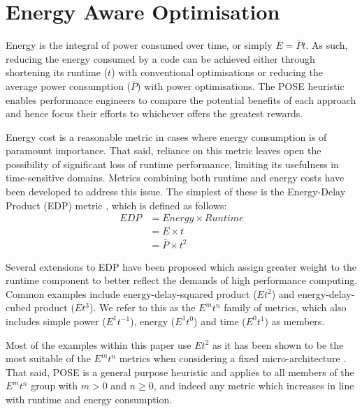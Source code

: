 \section{Energy Aware Optimisation}
\label{sec:optimisation}

Energy is the integral of power consumed over time, or simply $E = \bar{P}t$.
As such, reducing the energy consumed by a code can be achieved either through shortening its runtime ($t$) with conventional optimisations or reducing the average power consumption ($\bar{P}$) with power optimisations.
The POSE heuristic enables performance engineers to compare the potential benefits of each approach and hence focus their efforts to whichever offers the greatest rewards.

Energy cost is a reasonable metric in cases where energy consumption is of paramount importance.
That said, reliance on this metric leaves open the possibility of significant loss of runtime performance, limiting its usefulness in time-sensitive domains.
Metrics combining both runtime and energy costs have been developed to address this issue. 
The simplest of these is the Energy-Delay Product (EDP) metric \cite{gonzales:1995aa}, which is defined as follows:
\begin{align}
  EDP &= Energy \times Runtime \nonumber \\
      &= E \times t \nonumber \\
      &= \bar{P} \times t^2
  \label{eq:edp}
\end{align}

Several extensions to EDP have been proposed which assign greater weight to the runtime component to better reflect the demands of high performance computing.
Common examples include energy-delay-squared product ($Et^{2}$) and energy-delay-cubed product ($Et^{3}$).
We refer to this as the $E^mt^n$ family of metrics, which also includes simple power ($E^1t^{-1}$), energy ($E^1t^0$) and time ($E^0t^1$) as members.

Most of the examples within this paper use $Et^2$ as it has been shown to be the most suitable of the $E^mt^n$ metrics when considering a fixed micro-architecture \cite{brooks:2000aa}.
That said, POSE is a general purpose heuristic and applies to all members of the $E^mt^n$ group with $m > 0$ and $n \geq 0$, and indeed any metric which increases in line with runtime and energy consumption.
